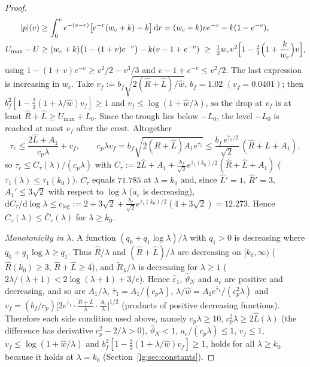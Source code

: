 \begin{proof}
\begin{align*}
|p|(v)&\ge\int_0^ve^{-(v-r)}\bigl[e^{-r}(w_c+k)-k\bigr]\,\mathrm dr=(w_c+k)ve^{-v}-k(1-e^{-v}),\\
U_{\max}-U&\ge(w_c+k)\bigl(1-(1+v)e^{-v}\bigr)-k(v-1+e^{-v})\ \ge\ \tfrac12w_cv^2\Bigl[1-\tfrac23\Bigl(1+\frac k{w_c}\Bigr)v\Bigr],
\end{align*}
using $1-(1+v)e^{-v}\ge v^2/2-v^3/3$ and $v-1+e^{-v}\le v^2/2$. The last expression is increasing in
$w_c$. Take $v_f:=b_f\sqrt{2(\hat R+\hat L)/\hat w}$, $b_f=1.02$ $(v_f=0.0401)$; then
$b_f^2[1-\tfrac23(1+\lambda/\hat w)v_f]\ge1$ and $v_f\le\log(1+\hat w/\lambda)$, so the drop at $v_f$ is at
least $\hat R+\hat L\ge U_{\max}+L_0$. Since the trough lies below $-L_0$, the level $-L_0$ is reached at most
$v_f$ after the crest. Altogether
\[
\tau_c\le\frac{2\hat L+A_1}{c_p\lambda}+v_f,\qquad
c_p\lambda v_f=b_f\sqrt{2(\hat R+\hat L)A_1e^{\bar\tau_1}}\le\frac{b_f\,e^{\bar\tau_1/2}}{\sqrt2}\,(\hat R+\hat L+A_1),
\]
so $\tau_c\le C_\tau(\lambda)/(c_p\lambda)$ with
$C_\tau:=2\hat L+A_1+\tfrac{b_f}{\sqrt2}e^{\bar\tau_1(k_0)/2}(\hat R+\hat L+A_1)$
($\bar\tau_1(\lambda)\le\bar\tau_1(k_0)$). $C_\tau$ equals $71.785$ at $\lambda=k_0$ and, since
$\hat L'=1$, $\hat R'=3$, $A_1'\le3\sqrt2$ with respect to $\log\lambda$ ($a_c$ is decreasing),
$\mathrm dC_\tau/\mathrm d\log\lambda\le c_{\log}:=2+3\sqrt2+\tfrac{b_f}{\sqrt2}e^{\bar\tau_1(k_0)/2}(4+3\sqrt2)=12.273$.
Hence $C_\tau(\lambda)\le\bar C_\tau(\lambda)$ for $\lambda\ge k_0$.

\emph{Monotonicity in $\lambda$.} A function $(q_0+q_1\log\lambda)/\lambda$ with $q_1>0$ is decreasing where
$q_0+q_1\log\lambda\ge q_1$. Thus $\hat R/\lambda$ and $(\hat R+\hat L)/\lambda$ are decreasing on $[k_0,\infty)$
($\hat R(k_0)\ge3$, $\hat R+\hat L\ge4$), and $\tilde R_\lambda/\lambda$ is decreasing for $\lambda\ge1$
($2\lambda/(\lambda+1)<2\log(\lambda+1)+3/e$). Hence $\hat\varepsilon_1$, $\hat\vartheta_N$ and $a_c$ are
positive and decreasing, and so are $A_1/\lambda$, $\bar\tau_1=A_1/(c_p\lambda)$,
$\lambda/\hat w=A_1e^{\bar\tau_1}/(c_p^2\lambda)$ and
$v_f=(b_f/c_p)\bigl[2e^{\bar\tau_1}\cdot\tfrac{\hat R+\hat L}{\lambda}\cdot\tfrac{A_1}{\lambda}\bigr]^{1/2}$
(products of positive decreasing functions). Therefore each side condition used above, namely
$c_p\lambda\ge10$, $c_p^2\lambda\ge2\hat L(\lambda)$ (the difference has derivative $c_p^2-2/\lambda>0$),
$\hat\vartheta_N<1$, $a_c/(c_p\lambda)\le1$, $v_f\le1$, $v_f\le\log(1+\hat w/\lambda)$ and
$b_f^2[1-\tfrac23(1+\lambda/\hat w)v_f]\ge1$, holds for all $\lambda\ge k_0$ because it holds at
$\lambda=k_0$ (Section~\ref{lg:sec:constants}).
\end{proof}

